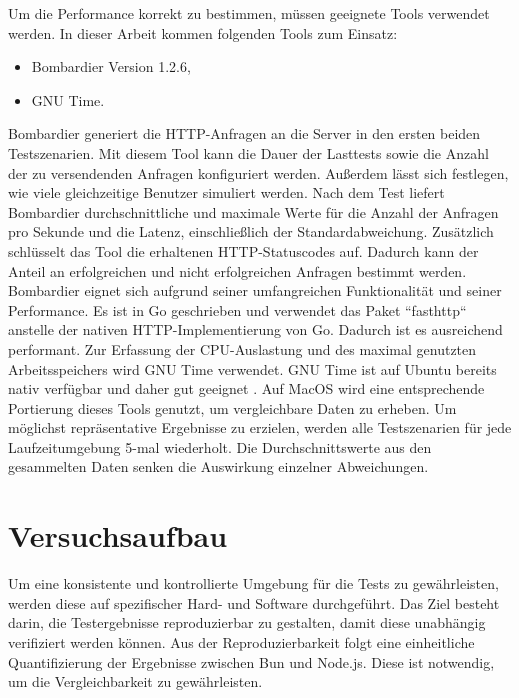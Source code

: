 \noindent
Um die Performance korrekt zu bestimmen, müssen geeignete Tools verwendet werden. In dieser Arbeit kommen folgenden Tools zum Einsatz:

\begin{itemize}
	\item Bombardier Version 1.2.6,
	\item GNU Time.
\end{itemize}

\noindent
Bombardier generiert die HTTP-Anfragen an die Server in den ersten beiden Testszenarien. Mit diesem Tool kann die Dauer der Lasttests sowie die Anzahl der zu versendenden Anfragen konfiguriert werden. Außerdem lässt sich festlegen, wie viele gleichzeitige Benutzer simuliert werden. Nach dem Test liefert Bombardier durchschnittliche und maximale Werte für die Anzahl der Anfragen pro Sekunde und die Latenz, einschließlich der Standardabweichung. Zusätzlich schlüsselt das Tool die erhaltenen HTTP-Statuscodes auf. Dadurch kann der Anteil an erfolgreichen und nicht erfolgreichen Anfragen bestimmt werden. Bombardier eignet sich aufgrund seiner umfangreichen Funktionalität und seiner Performance. Es ist in Go geschrieben und verwendet das Paket ``fasthttp`` anstelle der nativen HTTP-Implementierung von Go. Dadurch ist es ausreichend performant.\cite{Fedoseev.2016}\newline
Zur Erfassung der CPU-Auslastung und des maximal genutzten Arbeitsspeichers wird GNU Time verwendet. GNU Time ist auf Ubuntu bereits nativ verfügbar und daher gut geeignet \cite{FreeSoftwareFoundation.2018}. Auf MacOS wird eine entsprechende Portierung dieses Tools genutzt, um vergleichbare Daten zu erheben.\newline
Um möglichst repräsentative Ergebnisse zu erzielen, werden alle Testszenarien für jede Laufzeitumgebung 5-mal wiederholt. Die Durchschnittswerte aus den gesammelten Daten senken die Auswirkung einzelner Abweichungen.


\section{Versuchsaufbau} \label{sec:performance-testSetup}
Um eine konsistente und kontrollierte Umgebung für die Tests zu gewährleisten, werden diese auf spezifischer Hard- und Software durchgeführt. Das Ziel besteht darin, die Testergebnisse reproduzierbar zu gestalten, damit diese unabhängig verifiziert werden können. Aus der Reproduzierbarkeit folgt eine einheitliche Quantifizierung der Ergebnisse zwischen Bun und Node.js. Diese ist notwendig, um die Vergleichbarkeit zu gewährleisten.

